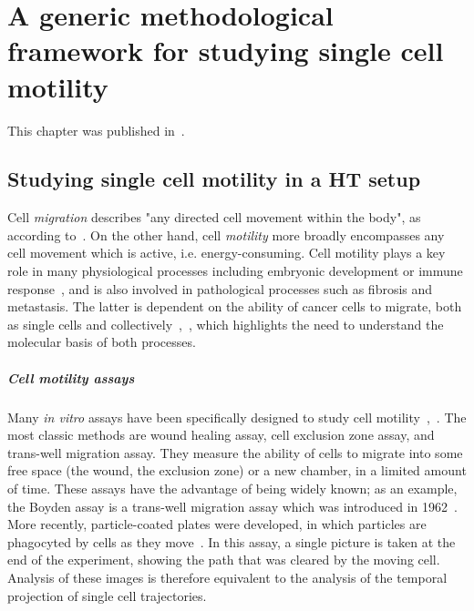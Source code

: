 
\chapter{A generic methodological framework for studying single cell motility}
This chapter was published in~\cite{motiw}.
\section{Studying single cell motility in a HT setup}

Cell \textit{migration} describes "any directed cell movement within the body", as according to~\cite{pmid22940039}. On the other hand, cell \textit{motility} more broadly encompasses any cell movement which is active, i.e. energy-consuming. Cell motility plays a key role in many physiological processes including embryonic development or immune response~\cite{pmid18711433}, and is also involved in pathological processes such as fibrosis and metastasis. The latter is dependent on the ability of cancer cells to migrate, both as single cells and collectively~\cite{pmid16888756},~\cite{pmid20460404}, which highlights the need to understand the molecular basis of both processes.

\paragraph{Cell motility assays}
Many \textit{in vitro} assays have been specifically designed to study cell motility~\cite{pmid16888756},~\cite{pmid22940039}. The most classic methods are wound healing assay, cell exclusion zone assay, and trans-well migration assay. They measure the ability of cells to migrate into some free space (the wound, the exclusion zone) or a new chamber, in a limited amount of time. These assays have the advantage of being widely known; as an example, the Boyden assay is a trans-well migration assay which was introduced in 1962~\cite{pmid13872176}. More recently, particle-coated plates were developed, in which particles are phagocyted by cells as they move~\cite{pmid329998}.
In this assay, a single picture is taken at the end of the experiment,
showing the path that was cleared by the moving cell. Analysis of
these images is therefore equivalent to the analysis of the temporal
projection of single cell trajectories.  

